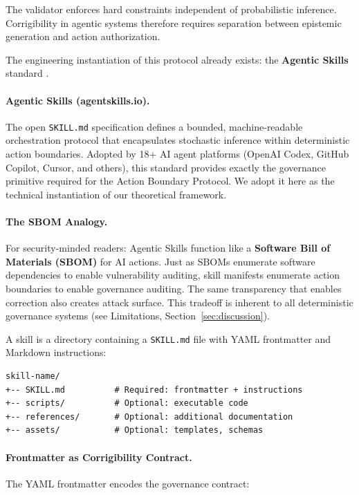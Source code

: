 \documentclass[11pt,a4paper]{article}
\theoremstyle{definition}
\begin{document}
The validator enforces hard constraints independent of probabilistic inference. Corrigibility in agentic systems therefore requires separation between epistemic generation and action authorization.

The engineering instantiation of this protocol already exists: the \textbf{Agentic Skills} standard \citep{agentskills2025}.

\paragraph{Agentic Skills (agentskills.io).} The open \texttt{SKILL.md} specification defines a bounded, machine-readable orchestration protocol that encapsulates stochastic inference within deterministic action boundaries. Adopted by 18+ AI agent platforms (OpenAI Codex, GitHub Copilot, Cursor, and others), this standard provides exactly the governance primitive required for the Action Boundary Protocol. We adopt it here as the technical instantiation of our theoretical framework.

\paragraph{The SBOM Analogy.} For security-minded readers: Agentic Skills function like a \textbf{Software Bill of Materials (SBOM)} for AI actions. Just as SBOMs enumerate software dependencies to enable vulnerability auditing, skill manifests enumerate action boundaries to enable governance auditing. The same transparency that enables correction also creates attack surface. This tradeoff is inherent to all deterministic governance systems (see Limitations, Section~\ref{sec:discussion}).

A skill is a directory containing a \texttt{SKILL.md} file with YAML frontmatter and Markdown instructions:

\begin{verbatim}
skill-name/
+-- SKILL.md          # Required: frontmatter + instructions
+-- scripts/          # Optional: executable code
+-- references/       # Optional: additional documentation
+-- assets/           # Optional: templates, schemas
\end{verbatim}

\paragraph{Frontmatter as Corrigibility Contract.} The YAML frontmatter encodes the governance contract:
\end{document}
